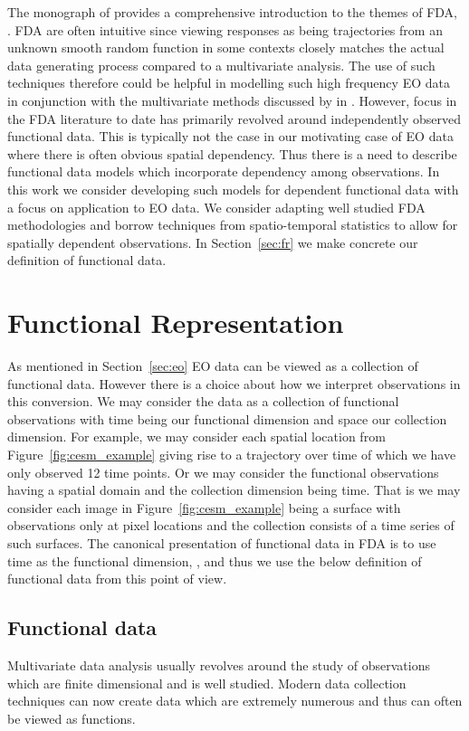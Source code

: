 The monograph of \citeauthor{ramsay_functional_2010} provides a comprehensive introduction to the themes of FDA, \citep{ramsay_functional_2010}.
FDA are often intuitive since viewing responses as being trajectories from an unknown smooth random function in some contexts closely matches the actual data generating process compared to a multivariate analysis.
The use of such techniques therefore could be helpful in modelling such high frequency EO data in conjunction with the multivariate methods discussed by \citeauthor{cressie_statistics_2011} in \citep{cressie_statistics_2011}.
However, focus in the FDA literature to date has primarily revolved around independently observed functional data.
This is typically not the case in our motivating case of EO data where there is often obvious spatial dependency.
Thus there is a need to describe functional data models which incorporate dependency among observations.
In this work we consider developing such models for dependent functional data with a focus on application to EO data.
We consider adapting well studied FDA methodologies and borrow techniques from spatio-temporal statistics to allow for spatially dependent observations.
In Section~\ref{sec:fr} we make concrete our definition of functional data. 

\section{Functional Representation \label{sec:fr}}
As mentioned in Section~\ref{sec:eo} EO data can be viewed as a collection of functional data.
However there is a choice about how we interpret observations in this conversion.
We may consider the data as a collection of functional observations with time being our functional dimension and space our collection dimension.
For example, we may consider each spatial location from Figure~\ref{fig:cesm_example} giving rise to a trajectory over time of which we have only observed 12 time points.
Or we may consider the functional observations having a spatial domain and the collection dimension being time.
That is we may consider each image in Figure~\ref{fig:cesm_example} being a surface with observations only at pixel locations and the collection consists of a time series of such surfaces. 
The canonical presentation of functional data in FDA is to use time as the functional dimension, \citep{ramsay_functional_2010}, and thus we use the below definition of functional data from this point of view. 

\subsection{Functional data \label{ssec:fd}}
Multivariate data analysis usually revolves around the study of observations which are finite dimensional and is well studied.
Modern data collection techniques can now create data which are extremely numerous and thus can often be viewed as functions.

